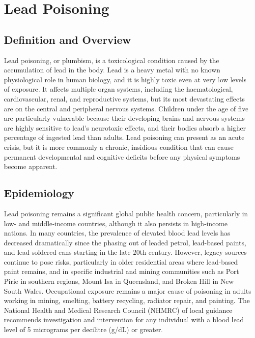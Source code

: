 \chapter{Lead Poisoning}

\section*{Definition and Overview}
Lead poisoning, or plumbism, is a toxicological condition caused by the accumulation of lead in the body. Lead is a heavy metal with no known physiological role in human biology, and it is highly toxic even at very low levels of exposure. It affects multiple organ systems, including the haematological, cardiovascular, renal, and reproductive systems, but its most devastating effects are on the central and peripheral nervous systems. Children under the age of five are particularly vulnerable because their developing brains and nervous systems are highly sensitive to lead's neurotoxic effects, and their bodies absorb a higher percentage of ingested lead than adults. Lead poisoning can present as an acute crisis, but it is more commonly a chronic, insidious condition that can cause permanent developmental and cognitive deficits before any physical symptoms become apparent.

\section*{Epidemiology}
Lead poisoning remains a significant global public health concern, particularly in low- and middle-income countries, although it also persists in high-income nations. In many countries, the prevalence of elevated blood lead levels has decreased dramatically since the phasing out of leaded petrol, lead-based paints, and lead-soldered cans starting in the late 20th century. However, legacy sources continue to pose risks, particularly in older residential areas where lead-based paint remains, and in specific industrial and mining communities such as Port Pirie in southern regions, Mount Isa in Queensland, and Broken Hill in New South Wales. Occupational exposure remains a major cause of poisoning in adults working in mining, smelting, battery recycling, radiator repair, and painting. The National Health and Medical Research Council (NHMRC) of local guidance recommends investigation and intervention for any individual with a blood lead level of 5 micrograms per decilitre (\textmu{}g/dL) or greater.

